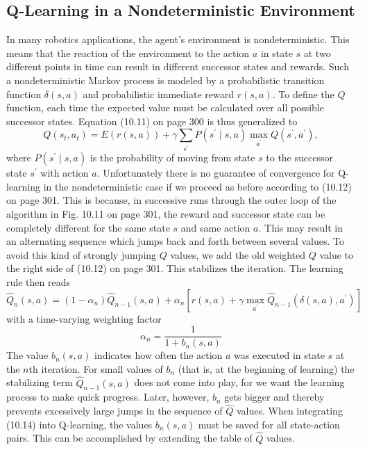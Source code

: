 \documentclass[10pt]{book}
\begin{document}
\subsection{Q-Learning in a Nondeterministic Environment}
In many robotics applications, the agent's environment is nondeterministic. This means that the reaction of the environment to the action $a$ in state $s$ at two different points in time can result in different successor states and rewards. Such a nondeterministic Markov process is modeled by a probabilistic transition function $\delta(s, a)$ and probabilistic immediate reward $r(s, a)$. To define the $Q$ function, each time the expected value must be calculated over all possible successor states. Equation (10.11) on page 300 is thus generalized to
\begin{equation*}
Q\left(s_{t}, a_{t}\right)=E(r(s, a))+\gamma \sum_{s^{\prime}} P\left(s^{\prime} \mid s, a\right) \max _{a^{\prime}} Q\left(s^{\prime}, a^{\prime}\right), \tag{10.13}
\end{equation*}
where $P\left(s^{\prime} \mid s, a\right)$ is the probability of moving from state $s$ to the successor state $s^{\prime}$ with action $a$. Unfortunately there is no guarantee of convergence for Q-learning in the nondeterministic case if we proceed as before according to (10.12) on page 301. This is because, in successive runs through the outer loop of the algorithm in Fig. 10.11 on page 301, the reward and successor state can be completely different for the same state $s$ and same action $a$. This may result in an alternating sequence which jumps back and forth between several values. To avoid this kind of strongly jumping $Q$ values, we add the old weighted $Q$ value to the right side of (10.12) on page 301. This stabilizes the iteration. The learning rule then reads
\begin{equation*}
\hat{Q}_{n}(s, a)=\left(1-\alpha_{n}\right) \hat{Q}_{n-1}(s, a)+\alpha_{n}\left[r(s, a)+\gamma \max _{a^{\prime}} \hat{Q}_{n-1}\left(\delta(s, a), a^{\prime}\right)\right] \tag{10.14}
\end{equation*}
with a time-varying weighting factor
$$
\alpha_{n}=\frac{1}{1+b_{n}(s, a)}
$$
The value $b_{n}(s, a)$ indicates how often the action $a$ was executed in state $s$ at the $n$th iteration. For small values of $b_{n}$ (that is, at the beginning of learning) the stabilizing term $\hat{Q}_{n-1}(s, a)$ does not come into play, for we want the learning process to make quick progress. Later, however, $b_{n}$ gets bigger and thereby prevents excessively large jumps in the sequence of $\hat{Q}$ values. When integrating (10.14) into Q-learning, the values $b_{n}(s, a)$ must be saved for all state-action pairs. This can be accomplished by extending the table of $\hat{Q}$ values.
\end{document}
